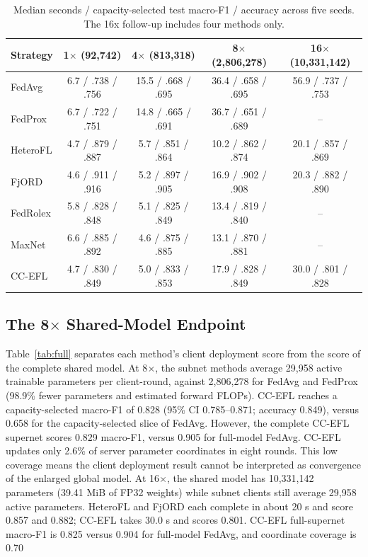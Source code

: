\documentclass[conference]{IEEEtran}
\begin{document}
\begin{table}[t]
\caption{Median seconds / capacity-selected test macro-F1 / accuracy across five seeds. The 16x follow-up includes four methods only.}
\label{tab:tradeoff}
\centering
\footnotesize
\begin{tabular}{@{}lcccc@{}}
\toprule
Strategy & 1$\times$ (92,742) & 4$\times$ (813,318) & 8$\times$ (2,806,278) & 16$\times$ (10,331,142) \\
\midrule
FedAvg & 6.7 / .738 / .756 & 15.5 / .668 / .695 & 36.4 / .658 / .695 & 56.9 / .737 / .753 \\
FedProx & 6.7 / .722 / .751 & 14.8 / .665 / .691 & 36.7 / .651 / .689 & -- \\
HeteroFL & 4.7 / .879 / .887 & 5.7 / .851 / .864 & 10.2 / .862 / .874 & 20.1 / .857 / .869 \\
FjORD & 4.6 / .911 / .916 & 5.2 / .897 / .905 & 16.9 / .902 / .908 & 20.3 / .882 / .890 \\
FedRolex & 5.8 / .828 / .848 & 5.1 / .825 / .849 & 13.4 / .819 / .840 & -- \\
MaxNet & 6.6 / .885 / .892 & 4.6 / .875 / .885 & 13.1 / .870 / .881 & -- \\
CC-EFL & 4.7 / .830 / .849 & 5.0 / .833 / .853 & 17.9 / .828 / .849 & 30.0 / .801 / .828 \\
\bottomrule
\end{tabular}
\end{table}

\subsection{The 8$\times$ Shared-Model Endpoint}
Table~\ref{tab:full} separates each method's client deployment score from the score of the complete shared model. At 8$\times$, the subnet methods average 29,958 active trainable parameters per client-round, against 2,806,278 for FedAvg and FedProx (98.9\% fewer parameters and estimated forward FLOPs). CC-EFL reaches a capacity-selected macro-F1 of 0.828 (95\% CI 0.785--0.871; accuracy 0.849), versus 0.658 for the capacity-selected slice of FedAvg. However, the complete CC-EFL supernet scores 0.829 macro-F1, versus 0.905 for full-model FedAvg. CC-EFL updates only 2.6\% of server parameter coordinates in eight rounds. This low coverage means the client deployment result cannot be interpreted as convergence of the enlarged global model. At 16$\times$, the shared model has 10,331,142 parameters (39.41 MiB of FP32 weights) while subnet clients still average 29,958 active parameters. HeteroFL and FjORD each complete in about 20 s and score 0.857 and 0.882; CC-EFL takes 30.0 s and scores 0.801. CC-EFL full-supernet macro-F1 is 0.825 versus 0.904 for full-model FedAvg, and coordinate coverage is 0.70%
\end{document}
